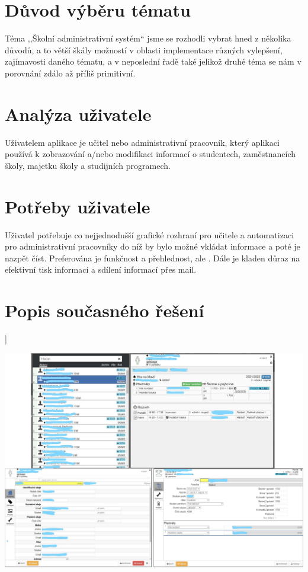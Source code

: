 \documentclass[a4paper, 11pt, twocolumn]{article}
\begin{document}
	
	\section*{\large{Důvod výběru tématu}}
	\vspace*{-0.2cm}
	Téma ,,Školní administrativní systém`` jsme se rozhodli vybrat hned z několika důvodů, a to větší škály možností v oblasti implementace různých vylepšení,
	zajímavosti daného tématu, a v neposlední řadě také jelikož druhé téma se nám v porovnání zdálo až příliš primitivní.

	\section*{\large{Analýza uživatele}}
	\vspace*{-0.2cm}
	Uživatelem aplikace je učitel nebo administrativní pracovník, který aplikaci používá k zobrazování a/nebo modifikaci informací o studentech, zaměstnancích školy, majetku školy a studijních programech. 

	\section*{\large{Potřeby uživatele}}
	\vspace*{-0.2cm}
	Uživatel potřebuje co nejjednodušší grafické rozhraní pro učitele a automatizaci pro administrativní pracovníky do níž by bylo možné vkládat informace a poté je nazpět číst. Preferována je funkčnost a přehlednost, ale . Dále je kladen důraz na efektivní tisk informací a sdílení informací přes mail.

	\section*{\large{Popis současného řešení}}
	\vspace*{-0.2cm}]
	\begin{center}
	\includegraphics[width=1\textwidth]{puvodni.png}
	\end{center}

\end{document}
